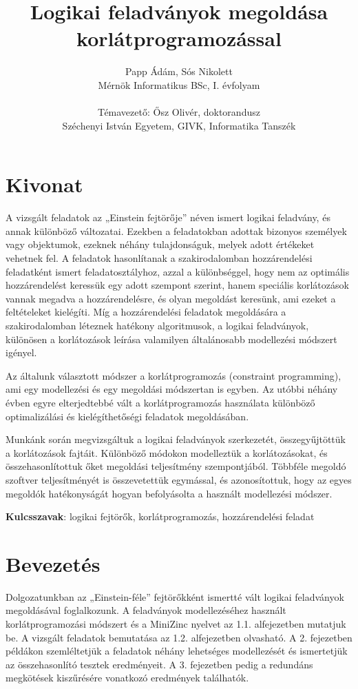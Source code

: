 \documentclass[12pt,a4paper,twoside, openright]{report}
\author{Papp Ádám, Sós Nikolett\\Mérnök Informatikus BSc, I. évfolyam\\\ \\Témavezető: Ősz Olivér, doktorandusz\\Széchenyi István Egyetem, GIVK, Informatika Tanszék}
\title{Logikai feladványok megoldása \\korlátprogramozással}
\begin{document}
\maketitle


\chapter*{Kivonat}

    A vizsgált feladatok az „Einstein fejtörője” néven ismert logikai feladvány, és annak különböző változatai.
    Ezekben a feladatokban adottak bizonyos személyek vagy objektumok, ezeknek néhány tulajdonságuk, melyek adott értékeket vehetnek fel.
    A feladatok hasonlítanak a szakirodalomban hozzárendelési feladatként ismert feladatosztályhoz, azzal a különbséggel, hogy nem az optimális hozzárendelést keressük egy adott szempont szerint, hanem speciális korlátozások vannak megadva a hozzárendelésre, és olyan megoldást keresünk, ami ezeket a feltételeket kielégíti.
    Míg a hozzárendelési feladatok megoldására a szakirodalomban léteznek hatékony algoritmusok, a logikai feladványok, különösen a korlátozások leírása valamilyen általánosabb modellezési módszert igényel.

    Az általunk választott módszer a korlátprogramozás (constraint programming), ami egy modellezési és egy megoldási módszertan is egyben.
    Az utóbbi néhány évben egyre elterjedtebbé vált a korlátprogramozás használata különböző optimalizálási és kielégíthetőségi feladatok megoldásában.

    Munkánk során megvizsgáltuk a logikai feladványok szerkezetét, összegyűjtöttük a korlátozások fajtáit.
    Különböző módokon modelleztük a korlátozásokat, és összehasonlítottuk őket megoldási teljesítmény szempontjából.
    Többféle megoldó szoftver teljesítményét is összevetettük egymással, és azonosítottuk, hogy az egyes megoldók hatékonyságát hogyan befolyásolta a használt modellezési módszer.

    \textbf{Kulcsszavak}: logikai fejtörők, korlátprogramozás, hozzárendelési feladat


\tableofcontents


\chapter{Bevezetés}

    Dolgozatunkban az „Einstein-féle” fejtörőkként ismertté vált logikai feladványok megoldásával foglalkozunk.
    A feladványok modellezéséhez használt korlátprogramozási módszert és a MiniZinc nyelvet az 1.1. alfejezetben mutatjuk be.
    A vizsgált feladatok bemutatása az 1.2. alfejezetben olvasható.
    A 2. fejezetben példákon szemléltetjük a feladatok néhány lehetséges modellezését és ismertetjük az összehasonlító tesztek eredményeit.
    A 3. fejezetben pedig a redundáns megkötések kiszűrésére vonatkozó eredmények találhatók.
\end{document}
